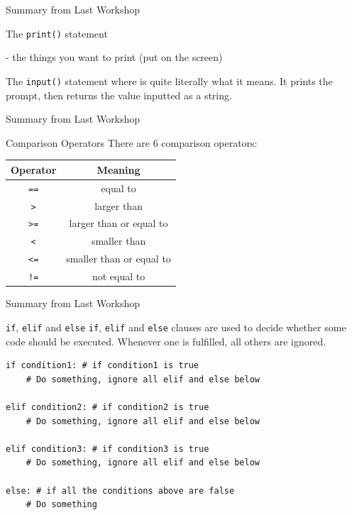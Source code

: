 \documentclass[dvipsnames, svgnames, x11names, handout]{beamer}
\begin{document}
\begin{frame}[fragile]{Summary from Last Workshop}
\begin{block}{The \texttt{print()} statement}

 - the things you want to print (put on the screen)
\end{block}

\begin{block}{The \texttt{input()} statement}
where  is quite literally what it means. It prints the prompt, then returns the value inputted as a string.
\end{block}
\end{frame}

\begin{frame}[fragile]{Summary from Last Workshop}
\begin{block}{Comparison Operators}
There are 6 comparison operators:
\begin{center}
\begin{tabular}{|c|c|}\hline
Operator & Meaning\\\hline
\texttt{==} & equal to\\\hline
\texttt{>} & larger than\\\hline
\texttt{>=} & larger than or equal to\\\hline
\texttt{<} & smaller than\\\hline
\texttt{<=} & smaller than or equal to\\\hline
\texttt{!=} & not equal to\\\hline
\end{tabular}
\end{center}
\end{block}
\end{frame}

\begin{frame}[fragile]{Summary from Last Workshop}
\begin{block}{\texttt{if}, \texttt{elif} and \texttt{else}}
\texttt{if}, \texttt{elif} and \texttt{else} clauses are used to decide whether some code should be executed.
Whenever one is fulfilled, all others are ignored.
\begin{verbatim}
if condition1: # if condition1 is true
    # Do something, ignore all elif and else below

elif condition2: # if condition2 is true
    # Do something, ignore all elif and else below

elif condition3: # if condition3 is true
    # Do something, ignore all elif and else below

else: # if all the conditions above are false
    # Do something
\end{verbatim}
\end{block}
\end{frame}
\end{document}
